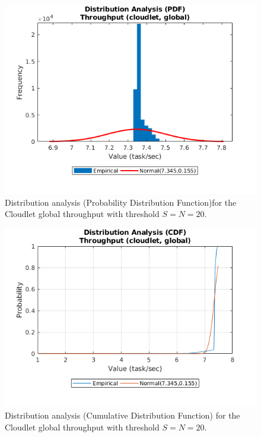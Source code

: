 \begin{figure}
	\includegraphics[width=\columnwidth]{fig/evaluation-distribution-analysis-pdf-throughput-cloudlet-global}
	\caption{Distribution analysis (Probability Distribution Function)for the Cloudlet global throughput with threshold $S=N=20$.}
	\label{fig:evaluation-distribution-analysis-pdf-throughput-cloudlet-global}
\end{figure}

\begin{figure}
	\includegraphics[width=\columnwidth]{fig/evaluation-distribution-analysis-cdf-throughput-cloudlet-global}
	\caption{Distribution analysis (Cumulative Distribution Function) for the Cloudlet global throughput with threshold $S=N=20$.}
	\label{fig:evaluation-distribution-analysis-cdf-throughput-cloudlet-global}
\end{figure}